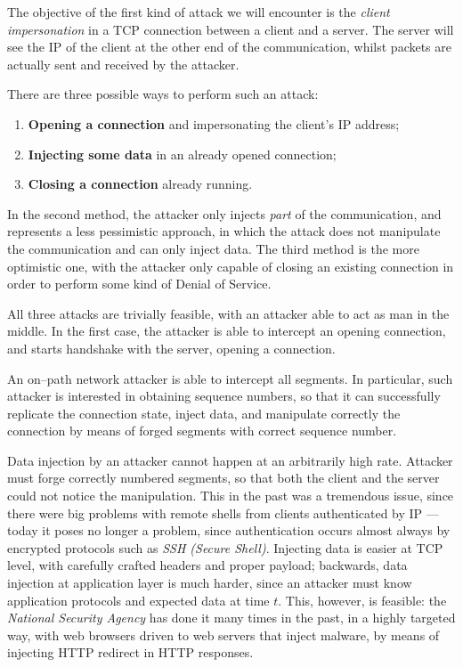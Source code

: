 \documentclass[10pt]{\classname}
\begin{document}
The objective of the first kind of attack we will encounter is the \emph{client
impersonation} in a TCP connection between a client and a server. The server
will see the IP of the client at the other end of the communication, whilst
packets are actually sent and received by the attacker.

There are three possible ways to perform such an attack:
\begin{enumerate}
    \item \textbf{Opening a connection} and impersonating the client's IP
        address;
    \item \textbf{Injecting some data} in an already opened connection;
    \item \textbf{Closing a connection} already running.
\end{enumerate}

In the second method, the attacker only injects \emph{part} of the
communication, and represents a less pessimistic approach, in which the attack
does not manipulate the communication and can only inject data. The third
method is the more optimistic one, with the attacker only capable of closing an
existing connection in order to perform some kind of Denial of Service.

All three attacks are trivially feasible, with an attacker able to act as man
in the middle. In the first case, the attacker is able to intercept an opening
connection, and starts handshake with the server, opening a connection.

An on--path network attacker is able to intercept all segments. In particular,
such attacker is interested in obtaining sequence numbers, so that it can
successfully replicate the connection state, inject data, and manipulate
correctly the connection by means of forged segments with correct sequence
number.

Data injection by an attacker cannot happen at an arbitrarily high rate.
Attacker must forge correctly numbered segments, so that both the client and
the server could not notice the manipulation. This in the past was a tremendous
issue, since there were big problems with remote shells from clients
authenticated by IP --- today it poses no longer a problem, since authentication
occurs almost always by encrypted protocols such as \emph{SSH (Secure Shell)}.
Injecting data is easier at TCP level, with carefully crafted headers and
proper payload; backwards, data injection at application layer is much harder,
since an attacker must know application protocols and expected data at time
$t$. This, however, is feasible: the \emph{National Security Agency} has done
it many times in the past, in a highly targeted way, with web browsers driven
to web servers that inject malware, by means of injecting HTTP redirect in HTTP
responses.
\end{document}
